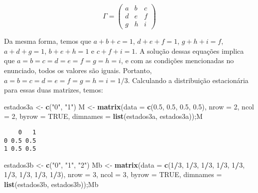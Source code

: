 \documentclass[
]{article}
\newenvironment{Shaded}{\begin{snugshade}}{\end{snugshade}}
\newcommand{\DataTypeTok}[1]{\textcolor[rgb]{0.13,0.29,0.53}{#1}}
\newcommand{\DecValTok}[1]{\textcolor[rgb]{0.00,0.00,0.81}{#1}}
\newcommand{\FloatTok}[1]{\textcolor[rgb]{0.00,0.00,0.81}{#1}}
\newcommand{\KeywordTok}[1]{\textcolor[rgb]{0.13,0.29,0.53}{\textbf{#1}}}
\newcommand{\NormalTok}[1]{#1}
\newcommand{\OperatorTok}[1]{\textcolor[rgb]{0.81,0.36,0.00}{\textbf{#1}}}
\newcommand{\OtherTok}[1]{\textcolor[rgb]{0.56,0.35,0.01}{#1}}
\newcommand{\StringTok}[1]{\textcolor[rgb]{0.31,0.60,0.02}{#1}}
\begin{document}
\[\Gamma = 
\begin{pmatrix}
a & b & c  \\
d & e & f  \\
g & h & i  
\end{pmatrix}\]

Da mesma forma, temos que \(a + b + c = 1\), \(d + e + f = 1\),
\(g + h + i = f\), \(a + d + g = 1\), \(b + e + h = 1\) e
\(c + f + i = 1\). A solução dessas equações implica que
\(a = b = c = d = e = f = g = h = i\), e com as condições mencionadas no
enunciado, todos os valores são iguais. Portanto,
\(a = b = c = d = e = f = g = h = i = 1/3\). Calculando a distribuição
estacionária para essas duas matrizes, temos:

\begin{Shaded}
\begin{Highlighting}[]
\NormalTok{estados3a <-}\StringTok{ }\KeywordTok{c}\NormalTok{(}\StringTok{"0"}\NormalTok{, }\StringTok{"1"}\NormalTok{)}
\NormalTok{M <-}\StringTok{ }\KeywordTok{matrix}\NormalTok{(}\DataTypeTok{data =} \KeywordTok{c}\NormalTok{(}\FloatTok{0.5}\NormalTok{, }\FloatTok{0.5}\NormalTok{, }\FloatTok{0.5}\NormalTok{, }\FloatTok{0.5}\NormalTok{), }\DataTypeTok{nrow =} \DecValTok{2}\NormalTok{, }\DataTypeTok{ncol =} \DecValTok{2}\NormalTok{,}
\DataTypeTok{byrow =} \OtherTok{TRUE}\NormalTok{, }\DataTypeTok{dimnames =} \KeywordTok{list}\NormalTok{(estados3a, estados3a));M}
\end{Highlighting}
\end{Shaded}

\begin{verbatim}
    0   1
0 0.5 0.5
1 0.5 0.5
\end{verbatim}

\begin{Shaded}
\begin{Highlighting}[]
\NormalTok{estados3b <-}\StringTok{ }\KeywordTok{c}\NormalTok{(}\StringTok{"0"}\NormalTok{, }\StringTok{"1"}\NormalTok{, }\StringTok{"2"}\NormalTok{)}
\NormalTok{Mb <-}\StringTok{ }\KeywordTok{matrix}\NormalTok{(}\DataTypeTok{data =} \KeywordTok{c}\NormalTok{(}\DecValTok{1}\OperatorTok{/}\DecValTok{3}\NormalTok{, }\DecValTok{1}\OperatorTok{/}\DecValTok{3}\NormalTok{, }\DecValTok{1}\OperatorTok{/}\DecValTok{3}\NormalTok{, }\DecValTok{1}\OperatorTok{/}\DecValTok{3}\NormalTok{, }\DecValTok{1}\OperatorTok{/}\DecValTok{3}\NormalTok{, }\DecValTok{1}\OperatorTok{/}\DecValTok{3}\NormalTok{, }\DecValTok{1}\OperatorTok{/}\DecValTok{3}\NormalTok{, }\DecValTok{1}\OperatorTok{/}\DecValTok{3}\NormalTok{, }\DecValTok{1}\OperatorTok{/}\DecValTok{3}\NormalTok{), }\DataTypeTok{nrow =} \DecValTok{3}\NormalTok{, }\DataTypeTok{ncol =} \DecValTok{3}\NormalTok{,}
\DataTypeTok{byrow =} \OtherTok{TRUE}\NormalTok{, }\DataTypeTok{dimnames =} \KeywordTok{list}\NormalTok{(estados3b, estados3b));Mb}
\end{Highlighting}
\end{Shaded}
\end{document}
